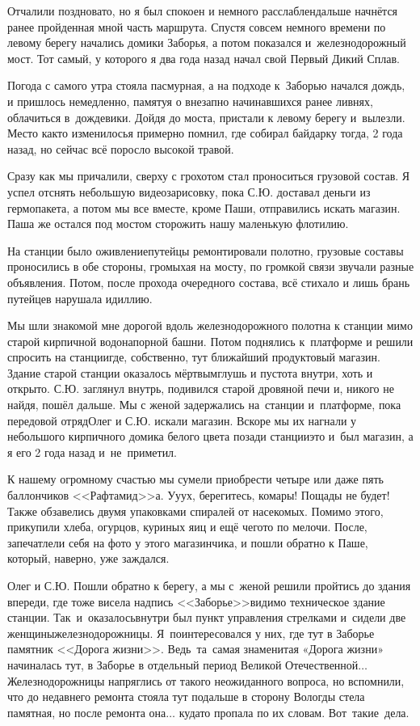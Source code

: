 Отчалили поздновато, но я был спокоен и немного расслаблен\mdash дальше начнётся ранее пройденная мной часть маршрута. Спустя совсем немного времени по левому берегу начались домики Заборья, а потом показался и~железнодорожный мост. Тот самый, у которого я два года назад начал свой Первый Дикий Сплав. 

Погода с самого утра стояла пасмурная, а на подходе к~Заборью начался дождь, и пришлось немедленно, памятуя о внезапно начинавшихся ранее ливнях, облачиться в~дождевики. Дойдя до моста, пристали к левому берегу и~вылезли. Место как\sdash то изменилось\mdash я примерно помнил, где собирал байдарку тогда, 2 года назад, но сейчас всё поросло высокой травой.

Сразу как мы причалили, сверху с грохотом стал проноситься грузовой состав. Я успел отснять небольшую видеозарисовку, пока С.Ю. доставал деньги из гермопакета, а потом мы все вместе, кроме Паши, отправились искать магазин. Паша же остался под мостом сторожить нашу маленькую флотилию. 

На станции было оживление\mdash путейцы ремонтировали полотно, грузовые составы проносились в обе стороны, громыхая на мосту, по громкой связи звучали разные объявления. Потом, после прохода очередного состава, всё стихало и лишь брань путейцев нарушала идиллию. 

Мы шли знакомой мне дорогой вдоль железнодорожного полотна к станции мимо старой кирпичной водонапорной башни. Потом поднялись к~платформе и решили спросить на станции\mdash где, собственно, тут ближайший продуктовый магазин. Здание старой станции оказалось мёртвым\mdash глушь и пустота внутри, хоть и открыто. С.Ю. заглянул внутрь, подивился старой дровяной печи и, никого не найдя, пошёл дальше. Мы с женой задержались на~станции и~платформе, пока передовой отряд\mdash Олег и С.Ю. искали магазин. Вскоре мы их нагнали у небольшого кирпичного домика белого цвета позади станции\mdash это и~был магазин, а я его 2 года назад и~не~приметил. 

К нашему огромному счастью мы сумели приобрести четыре или даже пять баллончиков <<Рафтамид>>\sdash а. У\sdash у\sdash у\sdash х, берегитесь, комары! Пощады не будет! Также обзавелись двумя упаковками спиралей от насекомых. Помимо этого, прикупили хлеба, огурцов, куриных яиц и ещё чего\sdash то по мелочи. После, запечатлели себя на фото у этого магазинчика, и пошли обратно к Паше, который, наверно, уже заждался.

Олег и С.Ю. Пошли обратно к берегу, а мы с~женой решили пройтись до здания впереди, где тоже висела надпись <<Заборье>>\mdash видимо техническое здание станции. Так~и~оказалось\mdash внутри был пункт управления стрелками и~сидели две женщины\sdash железнодорожницы. Я~поинтересовался у них, где тут в Заборье памятник <<Дорога жизни>>. Ведь~та~самая знаменитая «Дорога жизни» начиналась тут, в Заборье в отдельный период Великой Отечественной$\ldots$ Железнодорожницы напряглись от такого неожиданного вопроса, но вспомнили, что до недавнего ремонта стояла тут подальше в сторону Вологды стела памятная, но после ремонта она$\ldots$ куда\sdash то пропала по их словам. Вот~такие~дела.

